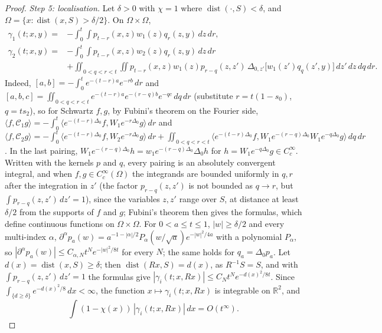 \documentclass[pdflatex,sn-mathphys-num]{sn-jnl}
\theoremstyle{thmstyleone}%
\theoremstyle{thmstylethree}%
\newcommand{\R}{\mathbb{R}}
\begin{document}
\begin{appendices}
\begin{proof}
\emph{Step 5: localisation.} Let $\delta>0$ with $\chi=1$ where $\operatorname{dist}(\cdot,S)<\delta$, and $\Omega=\{x:\operatorname{dist}(x,S)>\delta/2\}$. On $\Omega\times\Omega$,
\[
\begin{aligned}
\gamma_1(t;x,y)={}&-\int_0^t\!\!\int p_{t-r}(x,z)w_1(z)q_r(z,y)\,dz\,dr,\\
\gamma_2(t;x,y)={}&-\int_0^t\!\!\int p_{t-r}(x,z)w_2(z)q_r(z,y)\,dz\,dr\\
&+\iint_{0<q<r<t}\iint p_{t-r}(x,z)w_1(z)p_{r-q}(z,z')\,\Delta_{0,z'}\bigl[w_1(z')q_q(z',y)\bigr]\,dz'\,dz\,dq\,dr .
\end{aligned}
\]
Indeed, $[a,b]=-\int_0^te^{-(t-r)a}e^{-rb}\,dr$ and $[a,b,c]=\iint_{0<q<r<t}e^{-(t-r)a}e^{-(r-q)b}e^{-qc}\,dq\,dr$ (substitute $r=t(1-s_0)$, $q=ts_2$), so for Schwartz $f,g$, by Fubini's theorem on the Fourier side, $\langle f,\mathcal C_1g\rangle=-\int_0^t\langle e^{-(t-r)\Delta_0}f,W_1e^{-r\Delta_0}g\rangle\,dr$ and $\langle f,\mathcal C_2g\rangle=-\int_0^t\langle e^{-(t-r)\Delta_0}f,W_2e^{-r\Delta_0}g\rangle\,dr+\iint_{0<q<r<t}\langle e^{-(t-r)\Delta_0}f,W_1e^{-(r-q)\Delta_0}W_1e^{-q\Delta_0}g\rangle\,dq\,dr$. In the last pairing, $W_1e^{-(r-q)\Delta_0}h=w_1e^{-(r-q)\Delta_0}\Delta_0h$ for $h=W_1e^{-q\Delta_0}g\in C_c^\infty$. Written with the kernels $p$ and $q$, every pairing is an absolutely convergent integral, and when $f,g\in C_c^\infty(\Omega)$ the integrands are bounded uniformly in $q,r$ after the integration in $z'$ (the factor $p_{r-q}(z,z')$ is not bounded as $q\to r$, but $\int p_{r-q}(z,z')\,dz'=1$), since the variables $z,z'$ range over $S$, at distance at least $\delta/2$ from the supports of $f$ and $g$; Fubini's theorem then gives the formulas, which define continuous functions on $\Omega\times\Omega$. For $0<a\le t\le1$, $|w|\ge\delta/2$ and every multi-index $\alpha$, $\partial^\alpha p_a(w)=a^{-1-|\alpha|/2}P_\alpha(w/\sqrt a)e^{-|w|^2/4a}$ with a polynomial $P_\alpha$, so $|\partial^\alpha p_a(w)|\le C_{\alpha,N}t^Ne^{-|w|^2/8t}$ for every $N$; the same holds for $q_a=\Delta_0p_a$. Let $d(x)=\operatorname{dist}(x,S)\ge\delta$; then $\operatorname{dist}(Rx,S)=d(x)$, as $R^{-1}S=S$, and with $\int p_{r-q}(z,z')\,dz'=1$ the formulas give $|\gamma_i(t;x,Rx)|\le C_Nt^Ne^{-d(x)^2/8t}$. Since $\int_{\{d\ge\delta\}}e^{-d(x)^2/8}\,dx<\infty$, the function $x\mapsto\gamma_i(t;x,Rx)$ is integrable on $\R^2$, and
\[
\int(1-\chi(x))\,|\gamma_i(t;x,Rx)|\,dx=O(t^\infty).
\]


\end{proof}
\end{appendices}
\end{document}

